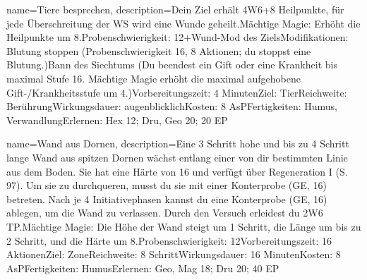 {
    name={Tiere besprechen},
    description={Dein Ziel erhält 4W6+8 Heilpunkte, für jede Überschreitung der WS wird eine Wunde geheilt.\newline Mächtige Magie: Erhöht die Heilpunkte um 8.\newline Probenschwierigkeit: 12+Wund-Mod des Ziels\newline Modifikationen: Blutung stoppen (Probenschwierigkeit 16, 8 Aktionen; du stoppst eine Blutung.)\newline Bann des Siechtums (Du beendest ein Gift oder eine Krankheit bis maximal Stufe 16. Mächtige Magie erhöht die maximal aufgehobene Gift-/Krankheitsstufe um 4.)\newline Vorbereitungszeit: 4 Minuten\newline Ziel: Tier\newline Reichweite: Berührung\newline Wirkungsdauer: augenblicklich\newline Kosten: 8 AsP\newline Fertigkeiten: Humus, Verwandlung\newline Erlernen: Hex 12; Dru, Geo 20; 20 EP}
}


{
    name={Wand aus Dornen},
    description={Eine 3 Schritt hohe und bis zu 4 Schritt lange Wand aus spitzen Dornen wächst entlang einer von dir bestimmten Linie aus dem Boden. Sie hat eine Härte von 16 und verfügt über Regeneration I (S. 97). Um sie zu durchqueren, musst du sie mit einer Konterprobe (GE, 16) betreten. Nach je 4 Initiativephasen kannst du eine Konterprobe (GE, 16) ablegen, um die Wand zu verlassen. Durch den Versuch erleidest du 2W6 TP.\newline Mächtige Magie: Die Höhe der Wand steigt um 1 Schritt, die Länge um bis zu 2 Schritt, und die Härte um 8.\newline Probenschwierigkeit: 12\newline Vorbereitungszeit: 16 Aktionen\newline Ziel: Zone\newline Reichweite: 8 Schritt\newline Wirkungsdauer: 16 Minuten\newline Kosten: 8 AsP\newline Fertigkeiten: Humus\newline Erlernen: Geo, Mag 18; Dru 20; 40 EP}
}


